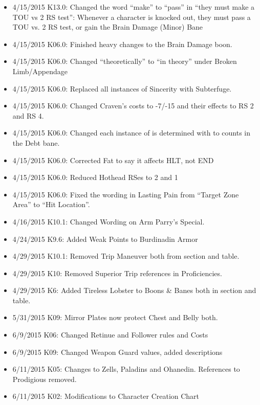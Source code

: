 \documentclass[oneside,11pt,english]{book}
\begin{document}
{\begin{itemize}
For their potentially unbalancing nature, all abnormal Social Class and Wealth combinations are subject 
to GM approval. Changed the Abnormal Social Class and Wealth Combinations table appropriately. 
Moved the spacing between the table and the large word Wealth to keep all the Wealth parts on 
the same page. 
\item 4/15/2015 K13.0: Changed the word “make” to “pass” in “they must make a TOU vs 2 RS test”: 
Whenever a character is knocked out, they must pass a TOU vs. 2 RS test, or gain the Brain Damage 
(Minor) Bane 
\item 4/15/2015 K06.0: Finished heavy changes to the Brain Damage boon. 
\item 4/15/2015 K06.0: Changed “theoretically” to “in theory” under Broken Limb/Appendage 
\item 4/15/2015 K06.0: Replaced all instances of Sincerity with Subterfuge. 
\item 4/15/2015 K06.0: Changed Craven’s costs to -7/-15 and their effects to RS 2 and RS 4. 
\item 4/15/2015 K06.0: Changed each instance of is determined with to counts in the Debt bane. 
\item 4/15/2015 K06.0: Corrected Fat to say it affects HLT, not END 
\item 4/15/2015 K06.0: Reduced Hothead RSes to 2 and 1 
\item 4/15/2015 K06.0: Fixed the wording in Lasting Pain from “Target Zone Area” to “Hit Location”. 
\item 4/16/2015 K10.1: Changed Wording on Arm Parry’s Special. 
\item 4/24/2015 K9.6: Added Weak Points to Burdinadin Armor 
\item 4/29/2015 K10.1: Removed Trip Maneuver both from section and table. 
\item 4/29/2015 K10: Removed Superior Trip references in Proficiencies. 
\item 4/29/2015 K6: Added Tireless Lobster to Boons \& Banes both in section and table. 
\item 5/31/2015 K09: Mirror Plates now protect Chest and Belly both. 
\item 6/9/2015 K06: Changed Retinue and Follower rules and Costs 
\item 6/9/2015 K09: Changed Weapon Guard values, added descriptions 
\item 6/11/2015 K05: Changes to Zells, Paladins and Ohanedin. References to Prodigious removed. 
\item 6/11/2015 K02: Modifications to Character Creation Chart 

\end{itemize}}
\end{document}
